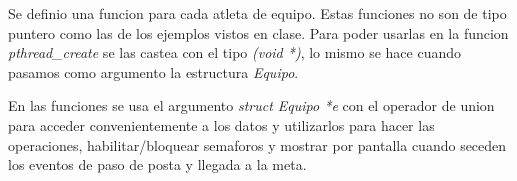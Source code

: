 \documentclass[a4paper, 14pt]{article}
\begin{document}
Se definio una funcion para cada atleta de equipo. Estas funciones no son de tipo puntero como las de los ejemplos vistos en clase. Para poder usarlas en la funcion \emph{pthread\_create} se las castea con el tipo \emph{(void *)}, lo mismo se hace cuando pasamos como argumento la estructura \emph{Equipo}.\newline

En las funciones se usa el argumento \emph{struct Equipo *e} con el operador de union para acceder convenientemente a los datos y utilizarlos para hacer las operaciones, habilitar/bloquear semaforos y mostrar por pantalla cuando seceden los eventos de paso de posta y llegada a la meta.\newline
\end{document}
